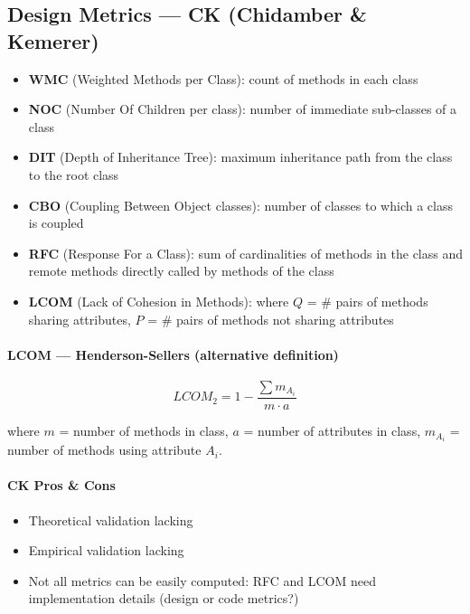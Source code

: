 
\subsection{Design Metrics — CK (Chidamber \& Kemerer)}

\begin{itemize}
  \item \textbf{WMC} (Weighted Methods per Class): count of methods in each class
  \item \textbf{NOC} (Number Of Children per class): number of immediate sub-classes of
        a class
  \item \textbf{DIT} (Depth of Inheritance Tree): maximum inheritance path from the class
        to the root class
  \item \textbf{CBO} (Coupling Between Object classes): number of classes to which a class
        is coupled
  \item \textbf{RFC} (Response For a Class): sum of cardinalities of methods in the class
        and remote methods directly called by methods of the class
  \item \textbf{LCOM} (Lack of Cohesion in Methods): where $Q$ = \# pairs of methods
        sharing attributes, $P$ = \# pairs of methods not sharing attributes
\end{itemize}

\paragraph{LCOM --- Henderson-Sellers (alternative definition)}

\[
  LCOM_2 = 1 - \frac{\sum m_{A_i}}{m \cdot a}
\]

\vspace{0.5cm}
where $m$ = number of methods in class, $a$ = number of attributes in class,
$m_{A_i}$ = number of methods using attribute $A_i$.

\paragraph{CK Pros \& Cons}
\begin{itemize}
  \item[$-$] Theoretical validation lacking
  \item[$-$] Empirical validation lacking
  \item[$-$] Not all metrics can be easily computed: RFC and LCOM need implementation
        details (design or code metrics?)
\end{itemize}
